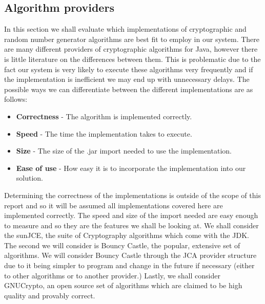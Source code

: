 \documentclass[12pt, titlepage]{article}
\begin{document}
\subsection{Algorithm providers}
In this section we shall evaluate which implementations of cryptographic and random number generator algorithms are best fit to employ in our system.
\newline \indent There are many different providers of cryptographic algorithms for Java, however there is little literature on the differences between them. This is problematic due to the fact our system is very likely to execute these algorithms very frequently and if the implementation is inefficient we may end up with unnecessary delays. The possible ways we can differentiate between the different implementations are as follows:
\begin{itemize}
	\item \textbf{Correctness} - The algorithm is implemented correctly.
	\item \textbf{Speed} - The time the implementation takes to execute.
	\item \textbf{Size} - The size of the .jar import needed to use the implementation.
	\item \textbf{Ease of use} - How easy it is to incorporate the implementation into our solution.
\end{itemize}
Determining the correctness of the implementations is outside of the scope of this report and so it will be assumed all implementations covered here are implemented correctly. The speed and size of the import needed are easy enough to measure and so they are the features we shall be looking at.
\newline \indent We shall consider the sunJCE, the suite of Cryptography algorithms which come with the JDK. The second we will consider is Bouncy Castle, the popular, extensive set of algorithms. We will consider Bouncy Castle through the JCA provider structure due to it being simpler to program and change in the future if necessary (either to other algorithms or to another provider.) Lastly, we shall consider GNUCrypto, an open source set of algorithms which are claimed to be high quality and provably correct.
\end{document}
